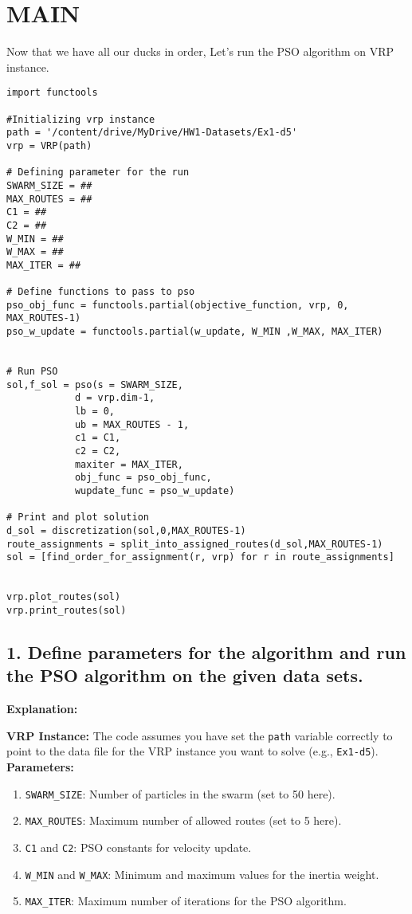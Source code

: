 \documentclass[letterpaper, 12pt]{article}
\begin{document}
\section*{MAIN}
Now that we have all our ducks in order, Let's run the PSO algorithm on VRP instance.

\begin{lstlisting}
import functools

#Initializing vrp instance
path = '/content/drive/MyDrive/HW1-Datasets/Ex1-d5'
vrp = VRP(path)

# Defining parameter for the run
SWARM_SIZE = ##
MAX_ROUTES = ##
C1 = ##
C2 = ##
W_MIN = ##
W_MAX = ##
MAX_ITER = ##

# Define functions to pass to pso
pso_obj_func = functools.partial(objective_function, vrp, 0, MAX_ROUTES-1)
pso_w_update = functools.partial(w_update, W_MIN ,W_MAX, MAX_ITER)


# Run PSO
sol,f_sol = pso(s = SWARM_SIZE,
            d = vrp.dim-1,
            lb = 0,
            ub = MAX_ROUTES - 1,
            c1 = C1,
            c2 = C2,
            maxiter = MAX_ITER,
            obj_func = pso_obj_func,
            wupdate_func = pso_w_update)

# Print and plot solution
d_sol = discretization(sol,0,MAX_ROUTES-1)
route_assignments = split_into_assigned_routes(d_sol,MAX_ROUTES-1)
sol = [find_order_for_assignment(r, vrp) for r in route_assignments]


vrp.plot_routes(sol)
vrp.print_routes(sol)
\end{lstlisting}

\subsection*{1. Define parameters for the algorithm and run the PSO algorithm on the given data sets.}
\textbf{Explanation:}

\textbf{VRP Instance:} The code assumes you have set the \verb|path| variable correctly to point to the data file for the VRP instance you want to solve (e.g., \verb|Ex1-d5|).
\textbf{Parameters:}

    \begin{enumerate}
        \item \verb|SWARM_SIZE|: Number of particles in the swarm (set to 50 here).
        \item \verb|MAX_ROUTES|: Maximum number of allowed routes (set to 5 here).
        \item \verb|C1| and \verb|C2|: PSO constants for velocity update.
        \item \verb|W_MIN| and \verb|W_MAX|: Minimum and maximum values for the inertia weight.
        \item \verb|MAX_ITER|: Maximum number of iterations for the PSO algorithm.
    \end{enumerate}
\end{document}
